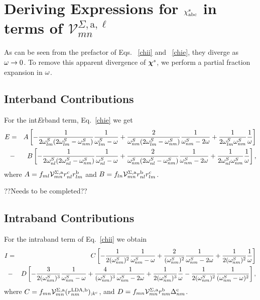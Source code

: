 \section{Deriving Expressions for $\chi^s_{\mathrm{a}\mathrm{b}\mathrm{c}}$ in terms of $\mathcal{V}^{\Sigma,\text{a},\ell}_{mn}$}\label{appv}

As can be seen from the prefactor of Eqs. ~\eqref{chii} and
~\eqref{chie}, they 
diverge as $\omega\to 0$. To remove this apparent 
divergence of $\boldsymbol{\chi}^s$, we perform
a partial fraction  expansion in $\omega$.

\subsection{Interband Contributions}

For
the int{\it E}rband term, Eq.~\eqref{chie} we get
\begin{eqnarray}\label{pfe}  
E&=&  
A
\left[
-\frac{1}{2\omega^S_{lm}(2\omega^S_{lm}-\omega^S_{nm})}\frac{1}{\omega^S_{lm}-\omega}
+\frac{2}{\omega^S_{nm}(2\omega^S_{lm}-\omega^S_{nm})}\frac{1}{\omega^S_{nm}-2\omega}
+\frac{1}{2\omega^S_{lm}\omega^S_{nm}}\frac{1}{\omega}
\right]
\nonumber\\
&-& 
B
\left[
-\frac{1}{2\omega^S_{nl}(2\omega^S_{nl}-\omega^S_{nm})}\frac{1}{\omega^S_{nl}-\omega}
+\frac{2}{\omega^S_{nm}(2\omega^S_{nl}-\omega^S_{nm})}\frac{1}{\omega^S_{nm}-2\omega}
+\frac{1}{2\omega^S_{nl}\omega^S_{nm}}\frac{1}{\omega}
\right]
,
\end{eqnarray}  
where 
$A=f_{ml}{\cal V}^{\Sigma,\mathrm{a}}_{mn}r^{\mathrm{c}}_{nl}r^{\mathrm{b}}_{lm}$   
and
$B=f_{ln}{\cal V}^{\Sigma,\mathrm{a}}_{mn}r^{\mathrm{b}}_{nl}r^{\mathrm{c}}_{lm}$.

??Needs to be completed??

\subsection{Intraband Contributions}

For the intraband term of Eq.~\eqref{chii}
we obtain
\begin{eqnarray}\label{pfinn} 
I&=& 
C
\left[
-\frac{1}{2(\omega^S_{nm})^2}\frac{1}{\omega^S_{nm}-\omega}
+\frac{2}{(\omega^S_{nm})^2}\frac{1}{\omega^S_{nm}-2\omega}
+\frac{1}{2(\omega^S_{nm})^2}\frac{1}{\omega}
\right]
\nonumber\\
&-&D
\left[
-\frac{3}{2(\omega^S_{nm})^3}\frac{1}{\omega^S_{nm}-\omega}
+\frac{4}{(\omega^S_{nm})^3}\frac{1}{\omega^S_{nm}-2\omega}
+\frac{1}{2(\omega^S_{nm})^3}\frac{1}{\omega}
-\frac{1}{2(\omega^S_{nm})^2}\frac{1}{(\omega^S_{nm}-\omega)^2}
\right]
,
\end{eqnarray} 
where 
$C=f_{mn}{\cal V}^{\Sigma,\mathrm{a}}_{mn}(r^{\mathrm{LDA},\mathrm{b}}_{nm})_{;k^{\mathrm{c}}}$, 
and
$D=f_{mn}{\cal V}^{\Sigma,\mathrm{a}}_{mn}r^{\mathrm{b}}_{nm}\Delta^{\mathrm{c}}_{nm}$.

